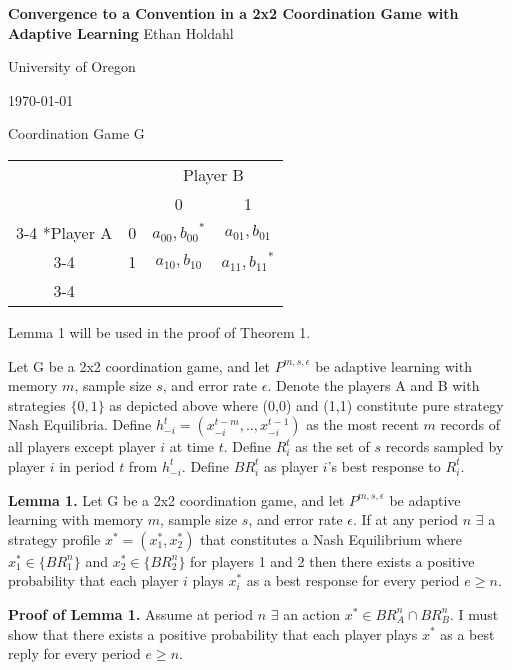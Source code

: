 \documentclass{article}
\begin{document}
\centering
\Large
\textbf{Convergence to a Convention in a 2x2 Coordination Game with Adaptive Learning}
\vskip0pt
Ethan Holdahl

\large
University of Oregon

\today

\vskip24pt

\centering
Coordination Game G
\vskip6pt
\begin{tabular}{cc|c|c|}
      & \multicolumn{1}{c}{} & \multicolumn{2}{c}{Player B}\\
      & \multicolumn{1}{c}{} & \multicolumn{1}{c}{0}  & \multicolumn{1}{c}{1} \\\cline{3-4}
      \multirow{2}*{Player A}  & 0 & ${a_{00},b_{00}}^*$ & $a_{01},b_{01}$ \\\cline{3-4}
      & 1 & $a_{10},b_{10}$ & ${a_{11},b_{11}}^*$ \\\cline{3-4}
    \end{tabular}
\vskip24pt

\raggedright

Lemma 1 will be used in the proof of Theorem 1.

\vskip12pt
Let G be a 2x2 coordination game, and let $P^{m,s,\epsilon}$ be adaptive learning with memory $m$, sample size $s$, and error rate $\epsilon$.
Denote the players A and B with strategies $\{0,1\}$ as depicted above where (0,0) and (1,1) constitute pure strategy Nash Equilibria. Define $h_{-i}^{t}=(x_{-i}^{t-m},..,x_{-i}^{t-1})$ as the most recent $m$ records of all players except player $i$ at time $t$. Define $R_i^{t}$ as the set of $s$ records sampled by player $i$ in period $t$ from $h_{-i}^{t}$. Define $BR_i^{t}$ as player $i$'s best response to $R_i^{t}$.

\vskip12pt

\textbf{Lemma 1.} Let G be a 2x2 coordination game, and let $P^{m,s,\epsilon}$ be adaptive learning with memory $m$, sample size $s$, and error rate $\epsilon$. If at any period $n$ $\exists$ a strategy profile $x^* = (x^*_1,x^*_2)$ that constitutes a Nash Equilibrium where $x^*_1 \in \{BR_1^{n}\}$ and $x^*_2 \in \{BR_2^{n}\}$ for players 1 and 2 then there exists a positive probability that each player $i$ plays $x^*_i$ as a best response for every period $e \geq n$.

\vskip12pt

\textbf{Proof of Lemma 1.} Assume at period $n$ $\exists$ an action $ x^* \in BR_A^{n} \cap BR_B^{n}$. I must show that there exists a positive probability that each player plays $x^*$ as a best reply for every period $e \geq n$.
\end{document}
